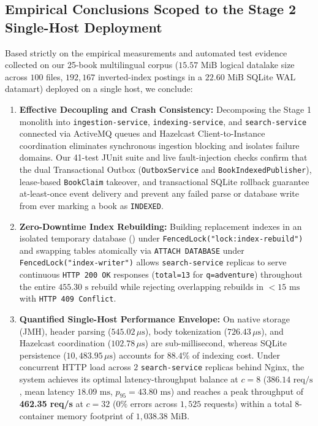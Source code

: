 \documentclass[10pt,a4paper]{article}
\begin{document}
\subsection{Empirical Conclusions Scoped to the Stage 2 Single-Host Deployment}
Based strictly on the empirical measurements and automated test evidence collected on our 25-book multilingual corpus ($15.57\text{ MiB}$ logical datalake size across $100$ files, $192,167$ inverted-index postings in a $22.60\text{ MiB}$ SQLite WAL datamart) deployed on a single host, we conclude:
\begin{enumerate}[leftmargin=*,nosep]
    \item \textbf{Effective Decoupling and Crash Consistency:} Decomposing the Stage 1 monolith into \texttt{ingestion-service}, \texttt{indexing-service}, and \texttt{search-service} connected via ActiveMQ queues and Hazelcast Client-to-Instance coordination eliminates synchronous ingestion blocking and isolates failure domains. Our 41-test JUnit suite and live fault-injection checks confirm that the dual Transactional Outbox (\texttt{OutboxService} and \texttt{BookIndexedPublisher}), lease-based \texttt{BookClaim} takeover, and transactional SQLite rollback guarantee at-least-once event delivery and prevent any failed parse or database write from ever marking a book as \texttt{INDEXED}.
    \item \textbf{Zero-Downtime Index Rebuilding:} Building replacement indexes in an isolated temporary database () under \texttt{FencedLock("lock:index-rebuild")} and swapping tables atomically via \texttt{ATTACH DATABASE} under \texttt{FencedLock("index-writer")} allows \texttt{search-service} replicas to serve continuous \texttt{HTTP 200 OK} responses (\texttt{total=13} for \texttt{q=adventure}) throughout the entire $455.30\text{ s}$ rebuild while rejecting overlapping rebuilds in $<15\text{ ms}$ with \texttt{HTTP 409 Conflict}.
    \item \textbf{Quantified Single-Host Performance Envelope:} On native storage (JMH), header parsing ($545.02\,\mu\text{s}$), body tokenization ($726.43\,\mu\text{s}$), and Hazelcast coordination ($102.78\,\mu\text{s}$) are sub-millisecond, whereas SQLite persistence ($10,483.95\,\mu\text{s}$) accounts for $88.4\%$ of indexing cost. Under concurrent HTTP load across $2$ \texttt{search-service} replicas behind Nginx, the system achieves its optimal latency-throughput balance at $c=8$ ($386.14\text{ req/s}$, mean latency $18.09\text{ ms}$, $p_{95} = 43.80\text{ ms}$) and reaches a peak throughput of \textbf{462.35 req/s} at $c=32$ ($0\%$ errors across $1,525$ requests) within a total 8-container memory footprint of $1,038.38\text{ MiB}$.
\end{enumerate}
\end{document}
